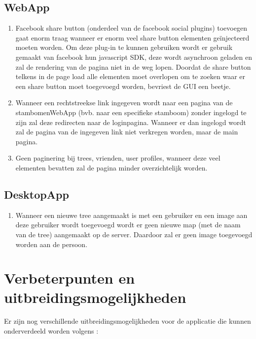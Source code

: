 \documentclass[pdftex,a4paper,12pt,twoside]{report}
\begin{document}
\section{WebApp}
\begin{enumerate}
\item \label{it:first}Facebook share button (onderdeel van de facebook social plugins) toevoegen gaat enorm traag wanneer er enorm veel share button elementen geïnjecteerd moeten worden.
Om deze plug-in te kunnen gebruiken wordt er gebruik gemaakt van facebook hun javascript SDK, deze wordt asynchroon geladen en zal de rendering van de pagina niet in de weg lopen.
Doordat de share button telkens in de page load alle elementen moet overlopen om te zoeken waar er een share button moet toegevoegd worden, bevriest de GUI een beetje.

\item \label{it:first}Wanneer een rechtstreekse link ingegeven wordt naar een pagina van de stambomenWebApp (bvb. naar een specifieke stamboom) zonder ingelogd te zijn zal deze redirecten naar de loginpagina. Wanneer er dan ingelogd wordt zal de pagina van de ingegeven link niet verkregen worden, maar de main pagina.

\item \label{it:first}Geen paginering bij trees, vrienden, user profiles, wanneer deze veel elementen bevatten zal de pagina minder overzichtelijk worden.
\end{enumerate}

\section{DesktopApp}
\begin{enumerate}
\item \label{it:first}Wanneer een nieuwe tree aangemaakt is met een gebruiker en een image aan deze gebruiker wordt toegevoegd wordt er geen nieuwe map (met de naam van de tree) aangemaakt op de server. Daardoor zal er geen image toegevoegd worden aan de persoon.
\end{enumerate}
\chapter{Verbeterpunten en uitbreidingsmogelijkheden}

Er zijn nog verschillende uitbreidingsmogelijkheden voor de applicatie die kunnen onderverdeeld worden volgens :
\end{document}
